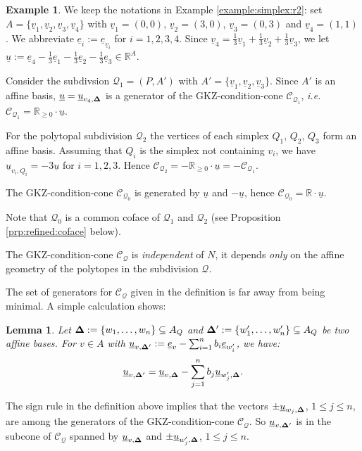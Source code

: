 \documentclass[12pt, a4article]{amsart}   	%
\numberwithin{equation}{section}
\theoremstyle{plain}
\newtheorem{lemma}[theorem]{Lemma}
\theoremstyle{definition}
\newtheorem{example}[theorem]{Example}
\newcommand{\R}{{\mathbb R}}
\newcommand{\bfDelta}{{\bf \Delta}}
\newcommand{\mcC}{{\mathcal C}}
\newcommand{\mcQ}{{\mathcal Q}}
\newcommand{\ue}{{\underline e}}
\newcommand{\uu}{{\underline u}}
\newcommand{\uv}{{\underline v}}
\begin{document}
\begin{example} 
We keep the notations in Example \ref{example:simplex:r2}:  set $A = \{\uv_1, \uv_2, \uv_3, \uv_4\}$ with $\uv_1 = (0,0)$, $\uv_2 = (3,0)$, $\uv_3 = (0,3)$ and $\uv_4 = (1,1)$. We abbreviate $\ue_i := \ue_{\uv_i}$ for $i=1,2,3,4$. Since $\uv_4 = \frac{1}{3}\uv_1 + \frac{1}{3}\uv_2 + \frac{1}{3}\uv_3$, we let $\uu := \ue_4 - \frac{1}{3}\ue_1 - \frac{1}{3}\ue_2 - \frac{1}{3}\ue_3\in\R^A$.

Consider the subdivsion $\mathcal Q_1 = (P,A')$ with $A' = \{\uv_1, \uv_2, \uv_3\}$. Since $A'$ is an affine basis, $\uu = \uu_{v_4, \bfDelta}$ is a generator of the GKZ-condition-cone $\mcC_{\mcQ_1}$, \emph{i.e.} $\mcC_{\mcQ_1} = \R_{\ge 0}\cdot \uu$.

For the polytopal subdivision $\mcQ_2$ the vertices of each simplex $Q_1,\,Q_2,\,Q_3$ form an affine basis. Assuming that $Q_i$ is the simplex not containing $v_i$, we have $\uu_{v_i,Q_i} = -3\uu$ for $i=1,2,3$. Hence $\mcC_{\mcQ_2} = -\R_{\geq 0}\cdot \uu = -\mcC_{\mcQ_1}$.

The GKZ-condition-cone $\mcC_{\mcQ_0}$ is generated by $\uu$ and $-\uu$, hence $\mcC_{\mcQ_0} = \R\cdot \uu$.

Note that $\mcQ_0$ is a common coface of $\mcQ_1$ and $\mcQ_2$ (see Proposition \ref{prp:refined:coface} below).
\end{example}

 The GKZ-condition-cone $\mcC_\mcQ$ is \emph{independent} of $N$, it depends \emph{only} on the affine geometry of the polytopes in the subdivision $\mcQ$.
\smallskip

The set of generators for $\mcC_\mcQ$ given in the definition is far away from being minimal. A simple calculation shows:

\begin{lemma}\label{Lem:BaseChange}
Let $\bfDelta:=\{ w_1,\ldots,w_n\}\subseteq A_Q$ 
and $\bfDelta':=\{ w_1',\ldots,  w_n'\}\subseteq A_Q$ be two affine bases.
For $v\in A$ with $ \uu_{v,\bfDelta'}:=\ue_v -\sum_{i=1}^n b_i\ue_{w_i'}$, we have:
$$ \uu_{v,\bfDelta'}=\uu_{v,\bfDelta}-\sum_{j=1}^n b_j\uu_{w_j',\bfDelta}.$$
\end{lemma}

The sign rule in the definition above implies that the vectors $\pm \uu_{  w_j,\bfDelta}$, $1\le j\le n$,
are among the generators of the GKZ-condition-cone $\mcC_\mcQ$.
So $ \uu_{v,\bfDelta'}$ is in the subcone of $\mcC_\mcQ$ spanned by $\uu_{v,\bfDelta}$ and  $\pm\uu_{w_j',\bfDelta}$,
$1\le j\le n$.
\end{document}
